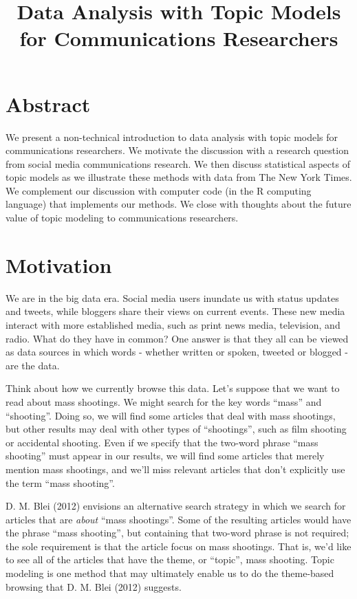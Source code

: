 \documentclass[12pt,]{article}
\title{Data Analysis with Topic Models for Communications Researchers}
\author{}
\date{}
\begin{document}
\maketitle

\pagestyle{fancy}

\section{Abstract}\label{abstract}

We present a non-technical introduction to data analysis with topic
models for communications researchers. We motivate the discussion with a
research question from social media communications research. We then
discuss statistical aspects of topic models as we illustrate these
methods with data from The New York Times. We complement our discussion
with computer code (in the R computing language) that implements our
methods. We close with thoughts about the future value of topic modeling
to communications researchers.

\section{Motivation}\label{motivation}

We are in the big data era. Social media users inundate us with status
updates and tweets, while bloggers share their views on current events.
These new media interact with more established media, such as print news
media, television, and radio. What do they have in common? One answer is
that they all can be viewed as data sources in which words - whether
written or spoken, tweeted or blogged - are the data.

Think about how we currently browse this data. Let's suppose that we
want to read about mass shootings. We might search for the key words
``mass'' and ``shooting''. Doing so, we will find some articles that
deal with mass shootings, but other results may deal with other types of
``shootings'', such as film shooting or accidental shooting. Even if we
specify that the two-word phrase ``mass shooting'' must appear in our
results, we will find some articles that merely mention mass shootings,
and we'll miss relevant articles that don't explicitly use the term
``mass shooting''.

D. M. Blei (2012) envisions an alternative search strategy in which we
search for articles that are \emph{about} ``mass shootings''. Some of
the resulting articles would have the phrase ``mass shooting'', but
containing that two-word phrase is not required; the sole requirement is
that the article focus on mass shootings. That is, we'd like to see all
of the articles that have the theme, or ``topic'', mass shooting. Topic
modeling is one method that may ultimately enable us to do the
theme-based browsing that D. M. Blei (2012) suggests.
\end{document}
